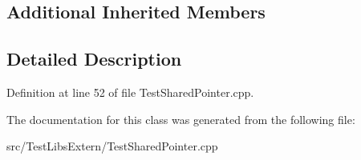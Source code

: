 \subsection*{Additional Inherited Members}


\subsection{Detailed Description}


Definition at line 52 of file Test\+Shared\+Pointer.\+cpp.



The documentation for this class was generated from the following file\+:\begin{DoxyCompactItemize}
\item 
src/\+Test\+Libs\+Extern/Test\+Shared\+Pointer.\+cpp\end{DoxyCompactItemize}
